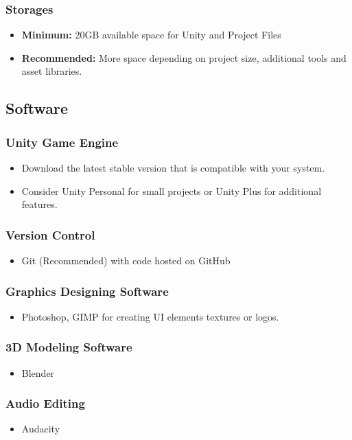 \subsubsection{Storages}
\begin{itemize}
	\item \textbf{Minimum:} 20GB available space for Unity and Project Files
	\item \textbf{Recommended:} More space depending on project size, additional tools and asset libraries.
\end{itemize}
\subsection{Software}
\subsubsection{Unity Game Engine}
\begin{itemize}
	\item Download the latest stable version that is compatible with your system.
	\item Consider Unity Personal for small projects or Unity Plus for additional features.
\end{itemize}
\subsubsection{Version Control}
\begin{itemize}
	\item Git (Recommended) with code hosted on GitHub
\end{itemize}
\subsubsection{Graphics Designing Software}
\begin{itemize}
	\item Photoshop, GIMP for creating UI elements textures  or logos.
\end{itemize}
\subsubsection{3D Modeling Software}
\begin{itemize}
\item	Blender
\end{itemize}
\subsubsection{Audio Editing}
\begin{itemize}
	\item Audacity
\end{itemize}
